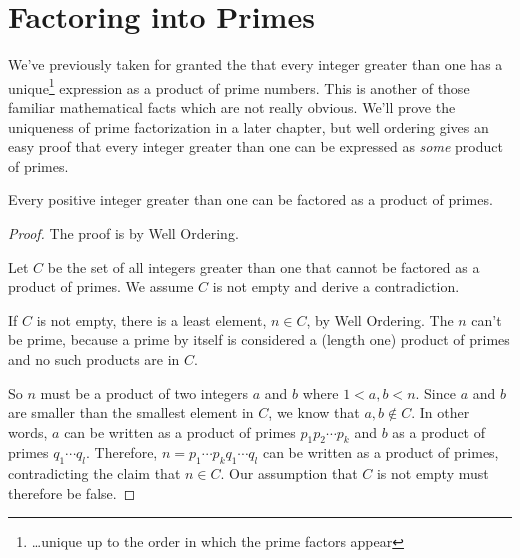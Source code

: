 \begin{problems}
\practiceproblems
{}

\classproblems
{}

\homeworkproblems
{}

\examproblems
{}
\end{problems}

\section{Factoring into Primes}

We've previously taken for granted the  that every integer greater than one has a
unique\footnote{\dots unique up to the order in which the prime
  factors appear} expression as a product of prime numbers.  This is
another of those familiar mathematical facts which are not really
obvious.  We'll prove the uniqueness of prime factorization in a later
chapter, but well ordering gives an easy proof that every integer
greater than one can be expressed as \emph{some} product of primes.

\begin{theorem}\label{factor_into_primes}
Every positive integer greater than one can be factored as a product of primes.
\end{theorem}
\begin{proof}
The proof is by Well Ordering.

Let $C$ be the set of all integers greater than one that cannot be
factored as a product of primes.  We assume $C$ is not empty and derive a
contradiction.

If $C$ is not empty, there is a least element, $n \in C$, by Well
Ordering.  The $n$ can't be prime, because a prime by itself is considered
a (length one) product of primes and no such products are in $C$.

So $n$ must be a product of two integers $a$ and $b$ where $1<a,b<n$.
Since $a$ and $b$ are smaller than the smallest element in $C$, we know
that $a,b \notin C$.  In other words, $a$ can be written as a product of
primes $p_1p_2\cdots p_k$ and $b$ as a product of primes $q_1\cdots q_l$.
Therefore, $n=p_1\cdots p_k q_1 \cdots q_l$ can be written as a product of
primes, contradicting the claim that $n \in C$.  Our assumption that $C$
is not empty must therefore be false.
\end{proof}

